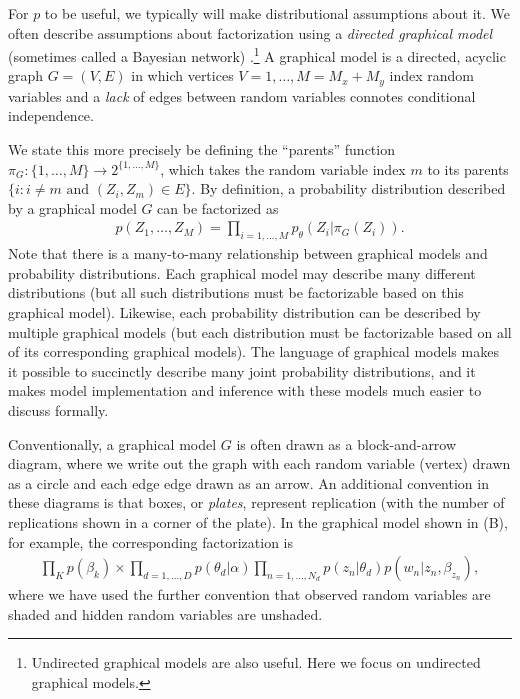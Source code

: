 For $p$ to be useful, we typically will make distributional
assumptions about it.  We often describe assumptions about
factorization using a \emph{directed graphical model} (sometimes
called a Bayesian network) \cite{pearl:1985}.\footnote{Undirected
  graphical models are also useful.  Here we focus on undirected
  graphical models.}  A graphical model is a directed, acyclic graph
$G = (V, E)$ in which vertices $V=1, \ldots, M = M_x + M_y$ index
random variables and a \emph{lack} of edges between random variables
connotes conditional independence.

We state this more precisely be defining the ``parents'' function
$\pi_G : \{ 1, \ldots, M \} \rightarrow 2^{\{ 1, \ldots, M \}}$, which
takes the random variable index $m$ to its parents $\{ i : i \neq m
\mbox{ and } (Z_i, Z_m) \in E \}$.  By definition, a probability
distribution described by a graphical model $G$ can be factorized as
\begin{align}
  p(Z_1, \ldots, Z_M) = \prod_{i=1, \ldots, M} p_\theta(Z_i | \pi_G(Z_i) ).
\end{align}
Note that there is a many-to-many relationship between graphical
models and probability distributions. Each graphical model may
describe many different distributions (but all such distributions must
be factorizable based on this graphical model).  Likewise, each
probability distribution can be described by multiple graphical
models (but each distribution must be factorizable based on all of its
corresponding graphical models). The language of graphical
models makes it possible to succinctly describe many joint probability
distributions, and it makes model implementation and inference with
these models much easier to discuss formally.

Conventionally, a graphical model $G$ is often drawn as a
block-and-arrow diagram, where we write out the graph with each random
variable (vertex) drawn as a circle and each edge edge drawn as an
arrow.  An additional convention in these diagrams is that boxes, or
\emph{plates}, represent replication (with the number of replications
shown in a corner of the plate). In the graphical model shown in
 (B), for example, the corresponding
factorization is
\begin{align}
  \prod_K p(\beta_k) \times \prod_{d=1,\ldots,D} p(\theta_d | \alpha) \prod_{n=1,\ldots,N_d} p(z_n | \theta_d) p(w_n | z_n, \beta_{z_n}),
\end{align}
where we have used the further convention that observed random
variables are shaded and hidden random variables are unshaded.

